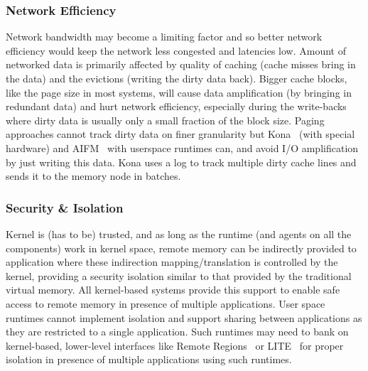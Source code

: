 \subsubsection{Network Efficiency}
Network bandwidth may become a limiting factor and so better 
network efficiency would keep the network less congested and 
latencies low. Amount of networked data is primarily affected 
by quality of caching (cache misses bring in the data) and 
the evictions (writing the dirty data back). Bigger cache
blocks, like the page size in most systems, will cause 
data amplification (by bringing in redundant data) and hurt 
network efficiency, especially during the write-backs where 
dirty data is usually only a small fraction of the block size. 
Paging approaches cannot track dirty data on finer granularity 
but Kona~\cite{kona} (with special hardware) and AIFM~\cite{aifm}
with userspace runtimes can, and avoid I/O amplification by just 
writing this data. Kona uses a log to track multiple dirty 
cache lines and sends it to the memory node in batches.

\subsubsection{Security \& Isolation}
Kernel is (has to be) trusted, and as long as the 
runtime (and agents on all the components) work in 
kernel space, remote memory can be indirectly provided 
to application where these indirection mapping/translation 
is controlled by the kernel, providing a security 
isolation similar to that provided by the traditional 
virtual memory. All kernel-based systems provide this 
support to enable safe access to remote memory in presence
of multiple applications. User space runtimes cannot 
implement isolation and support sharing between 
applications as they are restricted to a single application. 
Such runtimes may need to 
bank on kernel-based, lower-level interfaces like 
Remote Regions~\cite{remregions} or LITE~\cite{literdma}
for proper isolation in presence of multiple applications 
using such runtimes.


